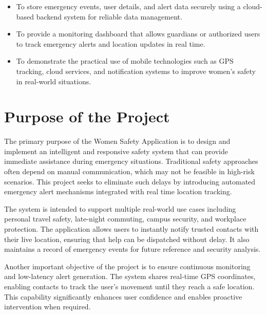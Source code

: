 \documentclass[a4paper,12pt]{report}
\begin{document}
\begin{itemize}
    \item To store emergency events, user details, and alert data securely using a cloud-based backend system for reliable data management.
\end{itemize}

\begin{itemize}
    \item To provide a monitoring dashboard that allows guardians or authorized users to track emergency alerts and location updates in real time.
\end{itemize}

\begin{itemize}
    \item To demonstrate the practical use of mobile technologies such as GPS tracking, cloud services, and notification systems to improve women’s safety in real-world situations.
\end{itemize}




\section{Purpose of the Project}

\par The primary purpose of the Women Safety Application is to design and implement an intelligent and responsive safety system that can provide immediate assistance during emergency situations. Traditional safety approaches often depend on manual communication, which may not be feasible in high-risk scenarios. This project seeks to eliminate such delays by introducing automated emergency alert mechanisms integrated with real time location tracking.
\\

\par The system is intended to support multiple real-world use cases including personal travel safety, late-night commuting, campus security, and workplace protection. The application allows users to instantly notify trusted contacts with their live location, ensuring that help can be dispatched without delay. It also maintains a record of emergency events for future reference and security analysis.\\

\par Another important objective of the project is to ensure continuous monitoring and low-latency alert generation. The system shares real-time GPS coordinates, enabling contacts to track the user’s movement until they reach a safe location. This capability
significantly enhances user confidence and enables proactive intervention when required.\\
\end{document}
